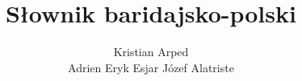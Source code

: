 \documentclass[10pt,a4paper]{article}
\title{Słownik baridajsko-polski}
\author{Kristian Arped \\ Adrien Eryk Esjar Józef Alatriste}
\begin{document}
\maketitle
\newpage

\begin{multicols}{2}
    
\end{multicols}
\end{document}
